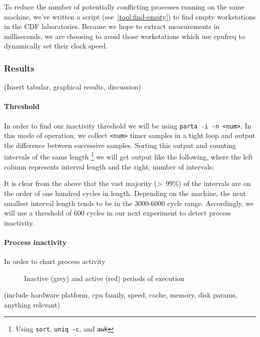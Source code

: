 \documentclass{article}
\begin{document}
To reduce the number of potentially conflicting processes running on the same
machine, we've written a script (see~\ref{tool:find-empty}) to find empty
workstations in the CDF laboratories. Because we hope to extract measurements
in milliseconds, we are choosing to avoid those workstations which use cpufreq
to dynamically set their clock speed.

\subsubsection{Results}
(Insert tabular, graphical results, discussion)

\paragraph{Threshold}
In order to find our inactivity threshold we will be using
\lstinline{parta -i -n <num>}. In this mode of operation, we collect
\lstinline{<num>} timer samples in a tight loop and output the difference
between successive samples. Sorting this output and counting intervals of the
same length \footnote{Using \lstinline{sort}, \lstinline{uniq -c}, and
\lstinline{awk}} we will get output like the following, where the left column
represents interval length and the right, number of intervals:
\begin{framed}
    \label{lst:intervals}
    
\end{framed}

It is clear from the above that the vast majority (\textgreater~99\%) of the
intervals are on the order of one hundred cycles in length. Depending on the
machine, the next smallest interval length tends to be in the 3000-6000 cycle
range. Accordingly, we will use a threshold of 600 cycles in our next
experiment to detect process inactivity.

\paragraph{Process inactivity}
In order to chart process activity

\begin{center}
    \begin{figure}[h]
        \caption{Inactive (grey) and active (red) periods of execution}
        
    \end{figure}
\end{center}
(include hardware platform, cpu family, speed, cache, memory, disk params, anything relevant)
\end{document}
